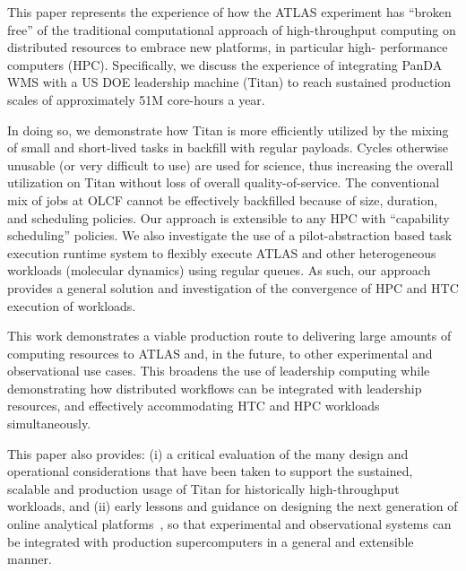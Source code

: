 
This paper represents the experience of how the ATLAS experiment has ``broken
free'' of the traditional computational approach of high-throughput computing
on distributed resources to embrace new platforms, in particular high-
performance computers (HPC). Specifically, we discuss the experience of
integrating PanDA WMS with a US DOE leadership machine (Titan) to reach
sustained production scales of approximately 51M core-hours a year.

In doing so, we demonstrate how Titan is more efficiently utilized by the
mixing of small and short-lived tasks in backfill with regular payloads.
Cycles otherwise unusable (or very difficult to use) are used for science,
thus increasing the overall utilization on Titan without loss of overall
quality-of-service. The conventional mix of jobs at OLCF cannot be effectively
backfilled because of size, duration, and scheduling policies. Our approach is
extensible to any HPC with ``capability scheduling'' policies.  We also
investigate the use of a pilot-abstraction based task execution runtime system
to flexibly execute ATLAS and other heterogeneous workloads (molecular
dynamics) using regular queues. As such, our approach provides a general
solution and investigation of the convergence of HPC and HTC execution of
workloads.

This work demonstrates a viable production route to delivering large amounts
of computing resources to ATLAS and, in the future, to other experimental and
observational use cases.  This broadens the use of leadership computing while
demonstrating how distributed workflows can be integrated with leadership
resources, and effectively accommodating HTC and HPC workloads simultaneously. 

This paper also provides: (i) a critical evaluation of the many design and
operational considerations that have been taken to support the sustained,
scalable and production usage of Titan for historically high-throughput
workloads, and (ii) early lessons and guidance on designing the next
generation of online analytical platforms~\cite{foap-url},  so that
experimental and observational systems can be integrated with production
supercomputers in a general and extensible manner.
